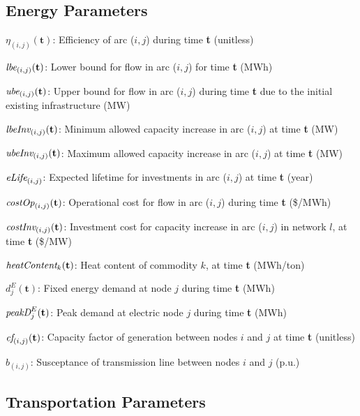 \documentclass{article}
\begin{document}
\subsection{Energy Parameters}

\begin{description}
\item $\eta_{(i,j)}(\textbf{t})$: Efficiency of arc ($i,j$) during time \textbf{t} (unitless)
\item $\emph{lbe}_{(i,j)}(\textbf{t})$: Lower bound for flow in arc ($i,j$) for time \textbf{t} (MWh)
\item $\emph{ube}_{(i,j)}(\textbf{t})$: Upper bound for flow in arc ($i,j$) during time \textbf{t} due to the initial existing infrastructure (MW)
\item $\emph{lbeInv}_{(i,j)}(\textbf{t})$: Minimum allowed capacity increase in arc ($i,j$) at time \textbf{t} (MW)
\item $\emph{ubeInv}_{(i,j)}(\textbf{t})$: Maximum allowed capacity increase in arc ($i,j$) at time \textbf{t} (MW)
\item $\emph{eLife}_{(i,j)}$: Expected lifetime for investments in arc ($i,j$) at time \textbf{t} (year)
\item $\emph{costOp}_{(i,j)}(\textbf{t})$: Operational cost for flow in arc ($i,j$) during time \textbf{t} (\$/MWh)
\item $\emph{costInv}_{(i,j)}(\textbf{t})$: Investment cost for capacity increase in arc ($i,j$) in network $l$, at time \textbf{t} (\$/MW)
\item $\emph{heatContent}_k(\textbf{t})$: Heat content of commodity $k$, at time \textbf{t} (MWh/ton)
\item $d^E_j(\textbf{t})$: Fixed energy demand at node $j$ during time \textbf{t} (MWh)
\item $\emph{peakD}^E_j(\textbf{t})$: Peak demand at electric node $j$ during time \textbf{t} (MWh)
\item $\emph{cf}_{(i,j)}(\textbf{t})$: Capacity factor of generation between nodes $i$ and $j$ at time \textbf{t} (unitless)
\item $b_{(i,j)}$: Susceptance of transmission line between nodes $i$ and $j$ (p.u.)
\end{description}


\subsection{Transportation Parameters}
\end{document}

